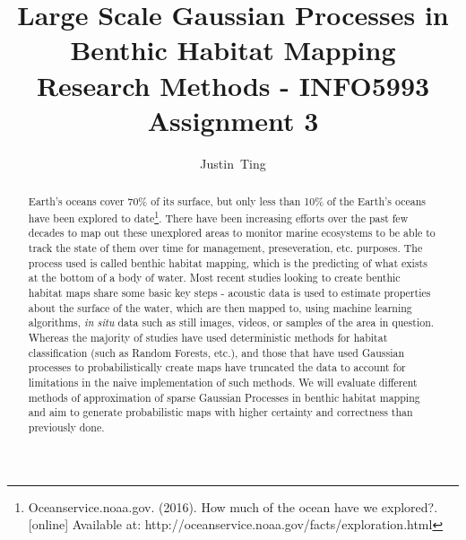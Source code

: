 \documentclass[journal]{IEEEtran}
\begin{document}
\title{Large Scale Gaussian Processes in Benthic Habitat Mapping \\ Research Methods - INFO5993 Assignment 3}

\author{Justin~Ting}

\maketitle

\begin{abstract}
    Earth's oceans cover 70\% of its surface, but only less than 10\% of the Earth's oceans have been explored to date\footnote{Oceanservice.noaa.gov. (2016). How much of the ocean have we explored?. [online] Available at: http://oceanservice.noaa.gov/facts/exploration.html}. There have been increasing efforts over the past few decades to map out these unexplored areas to monitor marine ecosystems to be able to track the state of them over time for management, preseveration, etc. purposes. The process used is called benthic habitat mapping, which is the predicting of what exists at the bottom of a body of water. Most recent studies looking to create benthic habitat maps share some basic key steps - acoustic data is used to estimate properties about the surface of the water, which are then mapped to, using machine learning algorithms, \textit{in situ} data such as still images, videos, or samples of the area in question. Whereas the majority of studies have used deterministic methods for habitat classification (such as Random Forests, etc.), and those that have used Gaussian processes to probabilistically create maps have truncated the data to account for limitations in the naive implementation of such methods. We will evaluate different methods of approximation of sparse Gaussian Processes in benthic habitat mapping and aim to generate probabilistic maps with higher certainty and correctness than previously done.
\end{abstract}







%
\IEEEpeerreviewmaketitle
\end{document}
